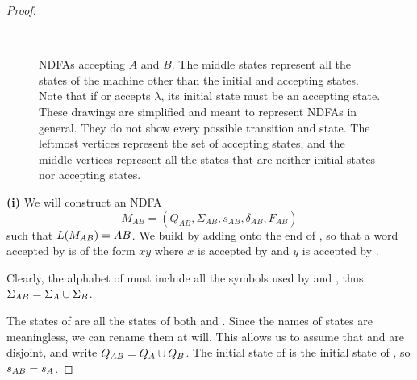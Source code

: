 \documentclass{bcthesis}
\begin{document}
\begin{proof}
		\begin{figure}[H]
			\centering
			\\
			\caption{
				NDFAs accepting $A$ and $B$.
				The middle states represent all the states of the machine other than the initial and accepting states.
				Note that if \ma or \mb accepts $\lambda$, its initial state must be an accepting state.
				These drawings are simplified and meant to represent NDFAs in general.
				They do not show every possible transition and state.
				The leftmost vertices represent the set of accepting states, and the middle vertices represent all the states that are neither initial states nor accepting states.
			}
			\label{fig:ma_and_mb}
		\end{figure}

		\noindent \textbf{(i)} \hspace{\parindent}
		We will construct an NDFA 
		\[
			M_{AB} = (Q_{AB}, \Sigma_{AB}, s_{AB}, \delta_{AB}, F_{AB})
		\]
		such that $L(M_{AB}) = AB$.
		We build \mab by adding \mb onto the end of \ma, so that a word accepted by \mab is of the form $xy$ where $x$ is accepted by \ma and $y$ is accepted by \mb.

		Clearly, the alphabet of \mab must include all the symbols used by \ma and \mb, thus $\Sigma_{AB} = \Sigma_A \cup \Sigma_B$.
		
		The states of \mab are all the states of both \ma and \mb.
		Since the names of states are meaningless, we can rename them at will. 
		This allows us to assume that \qa and \qb are disjoint, and write $Q_{AB} = Q_A \cup Q_B$.
		The initial state of \mab is the initial state of \ma, so $s_{AB} = s_A$.


\end{proof}
\end{document}
